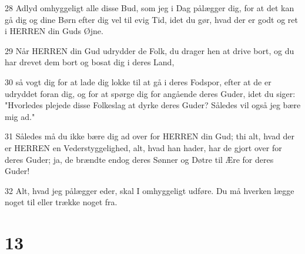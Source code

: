 \par 28 Adlyd omhyggeligt alle disse Bud, som jeg i Dag pålægger dig, for at det kan gå dig og dine Børn efter dig vel til evig Tid, idet du gør, hvad der er godt og ret i HERREN din Guds Øjne.
\par 29 Når HERREN din Gud udrydder de Folk, du drager hen at drive bort, og du har drevet dem bort og bosat dig i deres Land,
\par 30 så vogt dig for at lade dig lokke til at gå i deres Fodspor, efter at de er udryddet foran dig, og for at spørge dig for angående deres Guder, idet du siger: "Hvorledes plejede disse Folkeslag at dyrke deres Guder? Således vil også jeg bære mig ad."
\par 31 Således må du ikke bære dig ad over for HERREN din Gud; thi alt, hvad der er HERREN en Vederstyggelighed, alt, hvad han hader, har de gjort over for deres Guder; ja, de brændte endog deres Sønner og Døtre til Ære for deres Guder!
\par 32 Alt, hvad jeg pålægger eder, skal I omhyggeligt udføre. Du må hverken lægge noget til eller trække noget fra.

\chapter{13}

